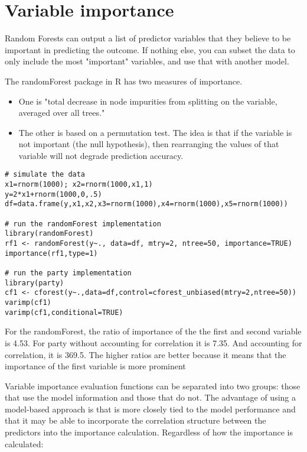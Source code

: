 \documentclass[caret-main.tex]{subfiles}
\begin{document}
\section*{Variable importance}
Random Forests can output a list of predictor variables that they believe to be important in predicting the outcome. If nothing else, you can subset the data to only include the most "important" variables, and use that with another model. 


\noindent The randomForest package in R has two measures of importance. 

\begin{itemize}
\item One is "total decrease in node impurities from splitting on the variable, averaged over all trees."
\item The other is based on a permutation test. 
The idea is that if the variable is not important (the null hypothesis), then rearranging the values of that variable 
will not degrade prediction accuracy. 
\end{itemize}
 

\begin{framed}
\begin{verbatim}
# simulate the data
x1=rnorm(1000); x2=rnorm(1000,x1,1)
y=2*x1+rnorm(1000,0,.5)
df=data.frame(y,x1,x2,x3=rnorm(1000),x4=rnorm(1000),x5=rnorm(1000))

# run the randomForest implementation
library(randomForest)
rf1 <- randomForest(y~., data=df, mtry=2, ntree=50, importance=TRUE)
importance(rf1,type=1)

# run the party implementation
library(party)
cf1 <- cforest(y~.,data=df,control=cforest_unbiased(mtry=2,ntree=50))
varimp(cf1)
varimp(cf1,conditional=TRUE)

\end{verbatim}
\end{framed}

For the randomForest, the ratio of importance of the the first and second variable is 4.53. 
For party without accounting for correlation it is 7.35. And accounting for correlation, it is 369.5. The higher ratios are better because it means that the importance of the first variable is more prominent

Variable importance evaluation functions can be separated into two groups: those that use the model information and those that do not. The advantage of using a model-based approach is that is more closely tied to the model performance and that it may be able to incorporate the correlation structure between the predictors into the importance calculation. Regardless of how the importance is calculated:
\end{document}
